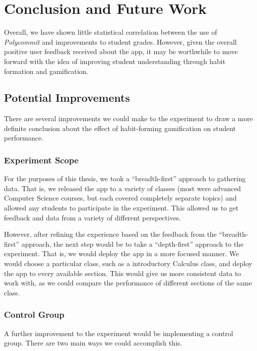 \chapter{Conclusion and Future Work}

\par Overall, we have shown little statistical correlation between the use of \textit{Polycommit} and improvements to student grades. However, given the overall positive user feedback received about the app, it may be worthwhile to move forward with the idea of improving student understanding through habit formation and gamification.

\section{Potential Improvements}


\par There are several improvements we could make to the experiment to draw a more definite conclusion about the effect of habit-forming gamification on student performance.

\subsection{Experiment Scope}

\par For the purposes of this thesis, we took a ``breadth-first'' approach to gathering data. That is, we released the app to a variety of classes (most were advanced Computer Science courses, but each covered completely separate topics) and allowed any students to participate in the experiment. This allowed us to get feedback and data from a variety of different perspectives.

\par However, after refining the experience based on the feedback from the ``breadth-first'' approach, the next step would be to take a ``depth-first'' approach to the experiment. That is, we would deploy the app in a more focused manner. We would choose a particular class, such as a introductory Calculus class, and deploy the app to every available section. This would give us more consistent data to work with, as we could compare the performance of different sections of the same class.

\subsection{Control Group}
\par A further improvement to the experiment would be implementing a control group. There are two main ways we could accomplish this. 

